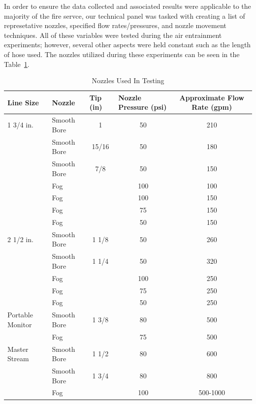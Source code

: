 \documentclass{article}
\begin{document}
In order to ensure the data collected and associated results were applicable to the majority of the fire servce, our technical panel was tasked with creating a list of represetative nozzles, specified flow rates/pressures, and nozzle movement techniques. All of these variables were tested during the air entrainment experiments; however, several other aspects were held constant such as the length of hose used. The nozzles utilized during these experiments can be seen in the Table~\ref{tab:Nozzle Selection}.

\vspace*{\baselineskip}

\begin{table}[!ht]
\centering
\caption{Nozzles Used In Testing}\label{tab:Nozzle Selection}
\begin{tabular}{llccc}
\toprule[1.5pt]
\multicolumn{1}{l}{\textbf{Line Size}} & \multicolumn{1}{l}{\textbf{Nozzle}} & \multicolumn{1}{l}{\textbf{Tip (in)}} & \multicolumn{1}{l}{\textbf{Nozzle Pressure (psi)}} & \textbf{Approximate Flow Rate (gpm)} \\
\midrule
1 3/4 in. & Smooth Bore & 1 & 50 & 210 \\
 & Smooth Bore & 15/16 & 50 & 180 \\
 & Smooth Bore & 7/8 & 50 & 150 \\
 & Fog &  & 100 & 100 \\
 & Fog &  & 100 & 150 \\
 & Fog &  & 75 & 150 \\
 & Fog &  & 50 & 150 \\
 \midrule
2 1/2 in. & Smooth Bore & 1 1/8 & 50 & 260 \\
 & Smooth Bore & 1 1/4 & 50 & 320 \\
 & Fog &  & 100 & 250 \\
 & Fog &  & 75 & 250 \\
 & Fog &  & 50 & 250 \\ 
 \midrule
Portable Monitor & Smooth Bore & 1 3/8 & 80 & 500 \\
 & Fog &  & 75 & 500 \\ 
 \midrule
Master Stream & Smooth Bore & 1 1/2 & 80 & 600 \\
 & Smooth Bore & 1 3/4 & 80 & 800 \\
 & Fog &  & 100 & 500-1000 \\ 
 \bottomrule[1.25pt]
\end{tabular}
\end{table}

\vspace*{\baselineskip}
\end{document}
